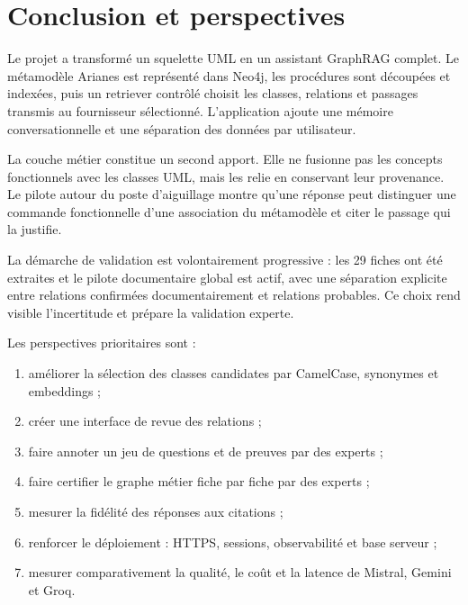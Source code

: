 \chapter{Conclusion et perspectives}

Le projet a transformé un squelette UML en un assistant GraphRAG complet. Le métamodèle Arianes est représenté dans Neo4j, les procédures sont découpées et indexées, puis un retriever contrôlé choisit les classes, relations et passages transmis au fournisseur sélectionné. L'application ajoute une mémoire conversationnelle et une séparation des données par utilisateur.

La couche métier constitue un second apport. Elle ne fusionne pas les concepts fonctionnels avec les classes UML, mais les relie en conservant leur provenance. Le pilote autour du poste d'aiguillage montre qu'une réponse peut distinguer une commande fonctionnelle d'une association du métamodèle et citer le passage qui la justifie.

La démarche de validation est volontairement progressive : les 29 fiches ont été extraites et le pilote documentaire global est actif, avec une séparation explicite entre relations confirmées documentairement et relations probables. Ce choix rend visible l'incertitude et prépare la validation experte.

Les perspectives prioritaires sont :

\begin{enumerate}
  \item améliorer la sélection des classes candidates par CamelCase, synonymes et embeddings ;
  \item créer une interface de revue des relations  ;
  \item faire annoter un jeu de questions et de preuves par des experts ;
  \item faire certifier le graphe métier fiche par fiche par des experts ;
  \item mesurer la fidélité des réponses aux citations ;
  \item renforcer le déploiement : HTTPS, sessions, observabilité et base serveur ;
  \item mesurer comparativement la qualité, le coût et la latence de Mistral, Gemini et Groq.
\end{enumerate}

